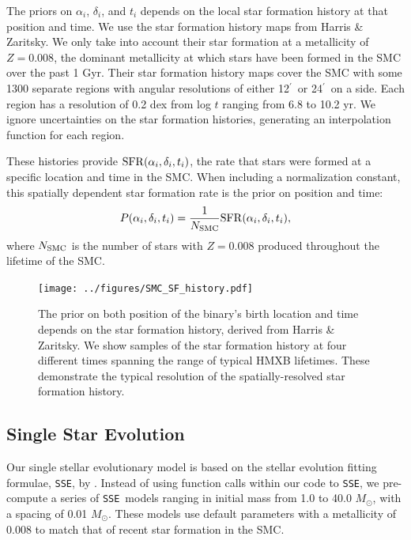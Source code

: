 \documentclass[12pt, preprint]{aastex}
\newcommand{\amin}{\ifmmode {^{\prime}\ }\else$^{\prime}$\fi}
\newcommand{\Msun}{\ifmmode {M_{\odot}}\else${M_{\odot}}$\fi}
\newcommand{\sse}{{\tt SSE}}
\begin{document}
The priors on $\alpha_i$, $\delta_i$, and $t_i$ depends on the local star formation history at that position and time. We use the star formation history maps from Harris \& Zaritsky. We only take into account their star formation at a metallicity of $Z=0.008$, the dominant metallicity at which stars have been formed in the SMC over the past 1 Gyr. Their star formation history maps cover the SMC with some 1300 separate regions with angular resolutions of either 12\amin\ or 24\amin\ on a side. Each region has a resolution of 0.2 dex from log $t$ ranging from 6.8 to 10.2 yr. We ignore uncertainties on the star formation histories, generating an interpolation function for each region. 

These histories provide ${\rm SFR}(\alpha_i, \delta_i, t_i)$, the rate that stars were formed at a specific location and time in the SMC. When including a normalization constant, this spatially dependent star formation rate is the prior on position and time:
\begin{equation}
P(\alpha_i, \delta_i, t_i) = \frac{1}{N_{\rm SMC}} {\rm SFR}(\alpha_i, \delta_i, t_i),
\end{equation}
where $N_{\rm SMC}$ is the number of stars with $Z=0.008$ produced throughout the lifetime of the SMC.



\begin{figure}[h!]
\begin{center}
\texttt{[image: ../figures/SMC\_SF\_history.pdf]}
\caption{The prior on both position of the binary's birth location and time depends on the star formation history, derived from Harris \& Zaritsky. We show samples of the star formation history at four different times spanning the range of typical HMXB lifetimes. These demonstrate the typical resolution of the spatially-resolved star formation history.}
\label{fig:prior_SFH}
\end{center}
\end{figure}




\subsection{Single Star Evolution} \label{sec:single_star}

Our single stellar evolutionary model is based on the stellar evolution fitting formulae, \sse, by \citet{hurley00}. Instead of using function calls within our code to \sse, we pre-compute a series of \sse\ models ranging in initial mass from 1.0 to 40.0 \Msun, with a spacing of 0.01 \Msun. These models use default parameters with a metallicity of 0.008 to match that of recent star formation in the SMC.
\end{document}

